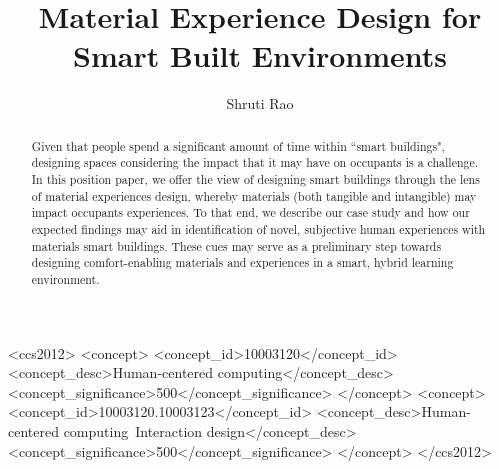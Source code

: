 \documentclass[manuscript, anonymous, review]{acmart}
\begin{document}
\title{Material Experience Design for Smart Built Environments}

\author{Shruti Rao}


\renewcommand{\shortauthors}{Rao et al.}

\begin{abstract}
Given that people spend a significant amount of time within ``smart buildings", designing spaces considering the impact that it may have on occupants is a challenge. In this position paper, we offer the view of designing smart buildings through the lens of material experiences design, whereby materials (both tangible and intangible) may impact occupants experiences. To that end, we describe our case study and how our expected findings may aid in identification of novel, subjective human experiences with materials smart buildings. These cues may serve as a preliminary step towards designing comfort-enabling materials  and experiences in a smart, hybrid learning environment. 
\end{abstract}


\begin{CCSXML}
<ccs2012>
   <concept>
       <concept_id>10003120</concept_id>
       <concept_desc>Human-centered computing</concept_desc>
       <concept_significance>500</concept_significance>
       </concept>
   <concept>
       <concept_id>10003120.10003123</concept_id>
       <concept_desc>Human-centered computing~Interaction design</concept_desc>
       <concept_significance>500</concept_significance>
       </concept>
 </ccs2012>
\end{CCSXML}
\end{document}
